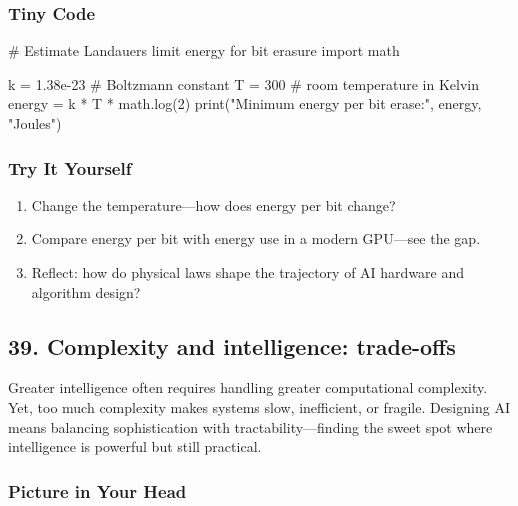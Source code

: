 \documentclass[
  letterpaper,
  DIV=11,
  numbers=noendperiod]{scrreprt}
\newenvironment{Shaded}{\begin{snugshade}}{\end{snugshade}}
\newcommand{\BuiltInTok}[1]{\textcolor[rgb]{0.00,0.23,0.31}{#1}}
\newcommand{\CommentTok}[1]{\textcolor[rgb]{0.37,0.37,0.37}{#1}}
\newcommand{\DecValTok}[1]{\textcolor[rgb]{0.68,0.00,0.00}{#1}}
\newcommand{\FloatTok}[1]{\textcolor[rgb]{0.68,0.00,0.00}{#1}}
\newcommand{\ImportTok}[1]{\textcolor[rgb]{0.00,0.46,0.62}{#1}}
\newcommand{\NormalTok}[1]{\textcolor[rgb]{0.00,0.23,0.31}{#1}}
\newcommand{\OperatorTok}[1]{\textcolor[rgb]{0.37,0.37,0.37}{#1}}
\newcommand{\StringTok}[1]{\textcolor[rgb]{0.13,0.47,0.30}{#1}}
\providecommand{\tightlist}{%
  \setlength{\itemsep}{0pt}\setlength{\parskip}{0pt}}
\begin{document}
\subsubsection{Tiny Code}\label{tiny-code-37}

\begin{Shaded}
\begin{Highlighting}[]
\CommentTok{\# Estimate Landauer\textquotesingle{}s limit energy for bit erasure}
\ImportTok{import}\NormalTok{ math}

\NormalTok{k }\OperatorTok{=} \FloatTok{1.38e{-}23}  \CommentTok{\# Boltzmann constant}
\NormalTok{T }\OperatorTok{=} \DecValTok{300}       \CommentTok{\# room temperature in Kelvin}
\NormalTok{energy }\OperatorTok{=}\NormalTok{ k }\OperatorTok{*}\NormalTok{ T }\OperatorTok{*}\NormalTok{ math.log(}\DecValTok{2}\NormalTok{)}
\BuiltInTok{print}\NormalTok{(}\StringTok{"Minimum energy per bit erase:"}\NormalTok{, energy, }\StringTok{"Joules"}\NormalTok{)}
\end{Highlighting}
\end{Shaded}

\subsubsection{Try It Yourself}\label{try-it-yourself-37}

\begin{enumerate}
\def\labelenumi{\arabic{enumi}.}
\tightlist
\item
  Change the temperature---how does energy per bit change?
\item
  Compare energy per bit with energy use in a modern GPU---see the gap.
\item
  Reflect: how do physical laws shape the trajectory of AI hardware and
  algorithm design?
\end{enumerate}

\subsection{39. Complexity and intelligence:
trade-offs}\label{complexity-and-intelligence-trade-offs}

Greater intelligence often requires handling greater computational
complexity. Yet, too much complexity makes systems slow, inefficient, or
fragile. Designing AI means balancing sophistication with
tractability---finding the sweet spot where intelligence is powerful but
still practical.

\subsubsection{Picture in Your Head}\label{picture-in-your-head-38}
\end{document}
